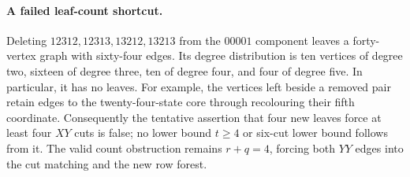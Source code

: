 \paragraph{A failed leaf-count shortcut.}
Deleting $12312,12313,13212,13213$ from the $00001$ component leaves
a forty-vertex graph with sixty-four edges. Its degree distribution is
ten vertices of degree two, sixteen of degree three, ten of degree four,
and four of degree five. In particular, it has no leaves.
For example, the vertices left beside a removed pair retain edges to
the twenty-four-state core through recolouring their fifth coordinate.
Consequently the tentative assertion that four new leaves force at
least four $XY$ cuts is false; no lower bound $t\ge4$ or six-cut
lower bound follows from it. The valid count obstruction remains
$r+q=4$, forcing both $YY$ edges into the cut matching and the new
row forest.
